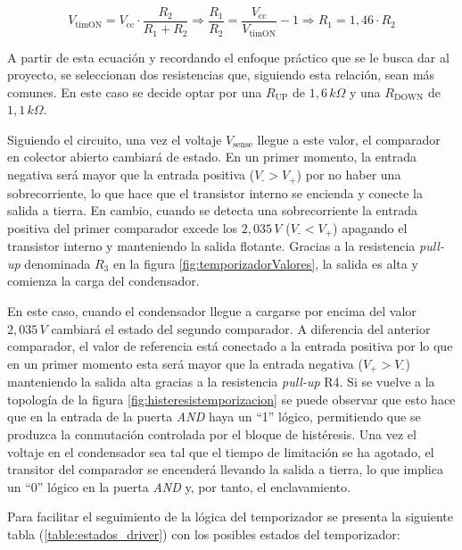 \documentclass[12pt]{report} %
\begin{document}
\begin{equation}
    \label{eq:resistencaisVtimON}
    V_\text{timON}= V_\text{cc} \cdot \frac{R_\text{2}}{R_\text{1} + R_\text{2}}\Rightarrow \frac{R_\text{1}}{R_\text{2}} = \frac{V_\text{cc}}{V_\text{timON}} - 1 \Rightarrow R_\text{1} = 1{,}46 \cdot R_\text{2}
\end{equation}

A partir de esta ecuación y recordando el enfoque práctico que se le busca dar al proyecto, se seleccionan dos resistencias que, siguiendo esta relación, sean más comunes. En este caso se decide optar por una $R_\text{UP}$ de $1{,}6\, k\Omega$ y una $R_\text{DOWN}$ de $1{,}1\, k\Omega$. 

Siguiendo el circuito, una vez el voltaje $V_\text{sense}$ llegue a este valor, el comparador en colector abierto cambiará de estado. En un primer momento, la entrada negativa será mayor que la entrada positiva ($V_\text{-} >V_\text{+}$) por no haber una sobrecorriente, lo que hace que el transistor interno se encienda y conecte la salida a tierra. En cambio, cuando se detecta una sobrecorriente la entrada positiva del primer comparador excede los $2{,}035\,V$ ($V_\text{-} <V_\text{+}$) apagando el transistor interno y manteniendo la salida flotante. Gracias a la resistencia \textit{pull-up} denominada $R_\text{3}$ en la figura \ref{fig:temporizadorValores}, la salida es alta y comienza la carga del condensador.

En este caso, cuando el condensador llegue a cargarse por encima del valor $2{,}035\,V$ cambiará el estado del segundo comparador. A diferencia del anterior comparador, el valor de referencia está conectado a la entrada positiva por lo que en un primer momento esta será mayor que la entrada negativa ($V_\text{+} >V_\text{-}$) manteniendo la salida alta gracias a la resistencia \textit{pull-up} R4. Si se vuelve a la topología de la figura \ref{fig:histeresistemporizacion} se puede observar que esto hace que en la entrada de la puerta \textit{AND} haya un ``1'' lógico, permitiendo que se produzca la conmutación controlada por el bloque de histéresis. 
Una vez el voltaje en el condensador sea tal que el tiempo de limitación se ha agotado, el transitor del comparador se encenderá llevando la salida a tierra, lo que implica un ``0'' lógico en la puerta \textit{AND} y, por tanto, el enclavamiento. 

Para facilitar el seguimiento de la lógica del temporizador se presenta la siguiente tabla (\ref{table:estados_driver}) con los posibles estados del temporizador:
\end{document}
